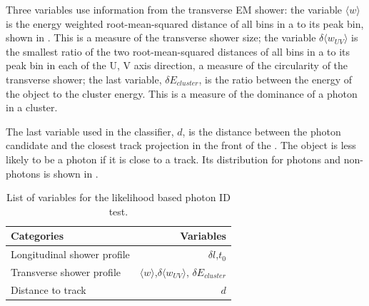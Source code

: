 Three variables use information from the transverse EM shower: the variable $\langle{w}\rangle$ is the energy weighted root-mean-squared distance of all bins in a \ShowerPeak to its peak bin, shown in . This is a measure of the transverse shower size; the variable $\delta{\langle{w_{UV}}\rangle}$ is the smallest ratio of the two root-mean-squared distances of all bins in a \ShowerPeak to its peak bin in each of the U, V axis direction, a measure of the circularity of the transverse shower; the last variable, $\delta E_{cluster}$, is the  ratio between the energy of the \ShowerPeak object to the cluster energy. This is a measure of the dominance of a photon in a cluster.

The last variable used in the classifier, $d$, is the distance between the photon candidate and the closest track projection in the front of the \ECAL. The \ShowerPeak object is less likely to be a photon if it is close to a track. Its distribution for photons and non-photons is shown in .


\begin{table}[htbp] \centering \smallskip
\begin{tabular}{l r }
\hline
\hline
Categories&  Variables\\
\hline
Longitudinal shower profile & $\delta{l}$,$t_0$ \\
Transverse shower profile & $\langle{w}\rangle$,$\delta{\langle{w_{UV}}\rangle}$, $\delta E_{cluster}$ \\
Distance to track &  $d$ \\
\hline
\hline
\end{tabular}
\caption
{List of variables for the likelihood based photon ID test.}
\label{tab:photonPhotonIDvar}
\end{table}

